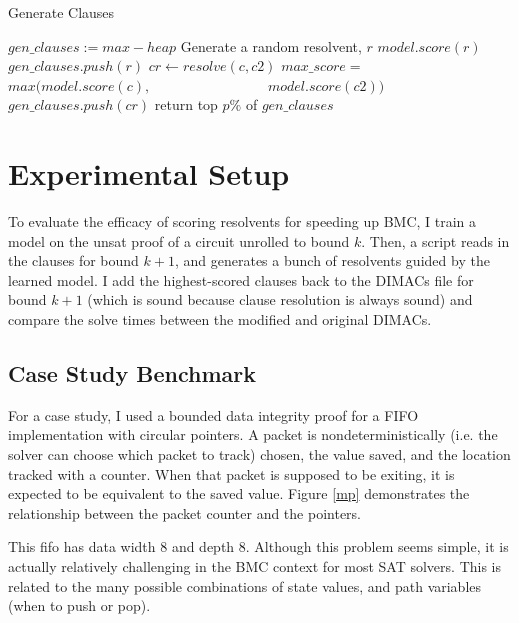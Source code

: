 \documentclass[letterpaper]{article} %
\begin{document}
\begin{algorithm}
\caption{Generate Clauses}\label{genclauses}
\begin{algorithmic}[1]
\State $gen\_clauses := max-heap$
\State Generate a random resolvent, $r$
\State $model.score(r)$
\State $gen\_clauses.push(r)$
\EndFor
{}
\State $cr \gets resolve(c, c2)$
\State $max\_score =$
\State \ \ \ \ \ \ \ $max(model.score(c),$ \State \ \ \ \ \ \ \ \ \ \ \ \ \ \ \ \ $model.score(c2))$
\State $gen\_clauses.push(cr)$
\EndIf
\EndFor
\EndFor
\EndWhile
\State return top $p\%$ of $gen\_clauses$
\EndProcedure
\end{algorithmic}
\end{algorithm} 

\section{Experimental Setup}

To evaluate the efficacy of scoring resolvents for speeding up BMC, I train a model on the unsat proof of a circuit unrolled to bound $k$. Then, a script reads in the clauses for bound $k+1$, and generates a bunch of resolvents guided by the learned model. I add the highest-scored clauses back to the DIMACs file for bound $k+1$ (which is sound because clause resolution is always sound) and compare the solve times between the modified and original DIMACs.

\subsection{Case Study Benchmark}

For a case study, I used a bounded data integrity proof for a FIFO implementation with circular pointers. A packet is nondeterministically (i.e. the solver can choose which packet to track) chosen, the value saved, and the location tracked with a counter. When that packet is supposed to be exiting, it is expected to be equivalent to the saved value. Figure \ref{mp} demonstrates the relationship between the packet counter and the pointers.

This fifo has data width 8 and depth 8. Although this problem seems simple, it is actually relatively challenging in the BMC context for most SAT solvers. This is related to the many possible combinations of state values, and path variables (when to push or pop).
\end{document}
